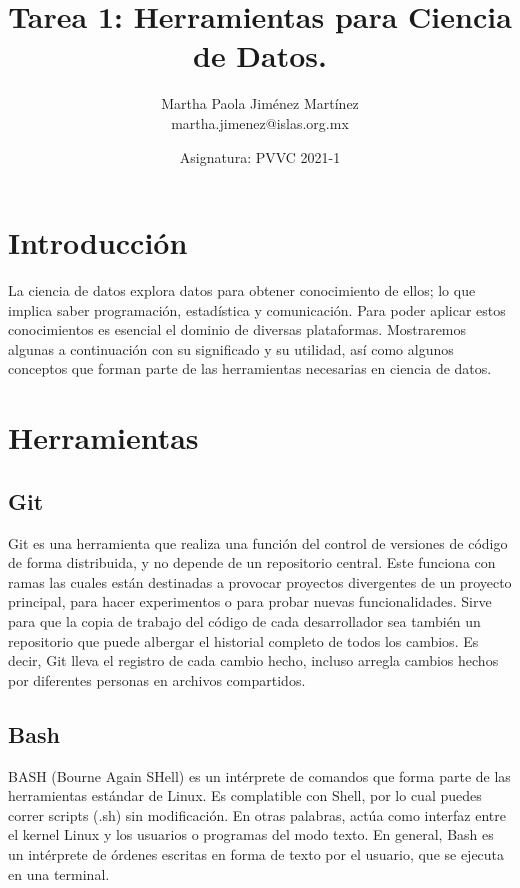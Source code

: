 \documentclass[12pt,letterpaper]{article}
\begin{document}
\title{\textbf{Tarea 1: Herramientas para Ciencia de Datos.}} \author{Martha Paola Jiménez Martínez
\\
\small{martha.jimenez@islas.org.mx}}
\date{ \small{Asignatura: PVVC 2021-1}
} 
\maketitle


\section*{Introducción}
La ciencia de datos explora datos para obtener conocimiento de ellos; lo que implica saber
programación, estadística y comunicación. Para poder aplicar estos conocimientos es esencial el
dominio de diversas plataformas. Mostraremos algunas a continuación con su significado y su
utilidad, así como algunos conceptos que forman parte de las herramientas necesarias en ciencia de
datos.

\section*{Herramientas}
\subsection*{Git}
Git es una herramienta que realiza una función del control de versiones de código de forma
distribuida, y no depende de un repositorio central. Este funciona con ramas las cuales están
destinadas a provocar proyectos divergentes de un proyecto principal, para hacer experimentos o para
probar nuevas funcionalidades.
\citep{rubio_2020}
Sirve para que la copia de trabajo del código de cada desarrollador sea también un repositorio que
puede albergar el historial completo de todos los cambios.
\citep{bitbucket_git}
Es decir, Git lleva el registro de cada cambio hecho, incluso arregla cambios hechos por diferentes
personas en archivos compartidos.

\subsection*{Bash}
BASH (Bourne Again SHell) es un intérprete de comandos que forma parte de las herramientas estándar
de Linux. Es complatible con Shell, por lo cual puedes correr scripts (.sh) sin modificación. En
otras palabras, actúa como interfaz entre el kernel Linux y los usuarios o programas del modo texto.
\citep{canepa_2018}
En general, Bash es un intérprete de órdenes escritas en forma de texto por el usuario, que se
ejecuta en una terminal.
\end{document}
